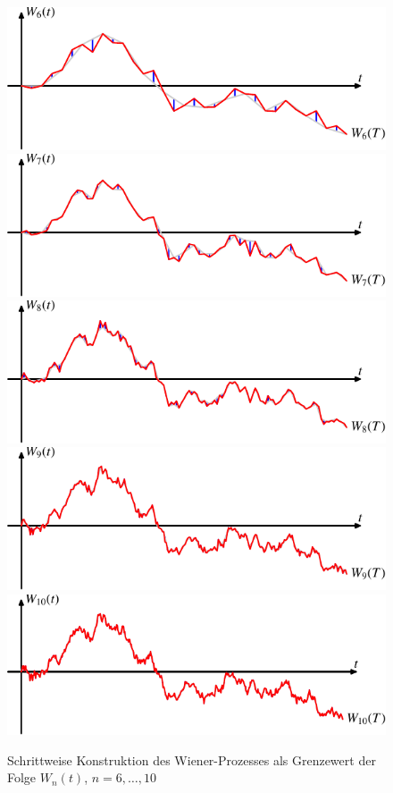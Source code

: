 \begin{figure}
\centering
\includegraphics{chapters/images/stochastisch-8.pdf}\\
\includegraphics{chapters/images/stochastisch-9.pdf}\\
\includegraphics{chapters/images/stochastisch-10.pdf}\\
\includegraphics{chapters/images/stochastisch-11.pdf}\\
\includegraphics{chapters/images/stochastisch-12.pdf}
\caption{Schrittweise Konstruktion des Wiener-Prozesses als Grenzewert
der Folge $W_n(t)$, $n=6,\dots,10$
\label{stochastisch:folge2}}
\end{figure}


